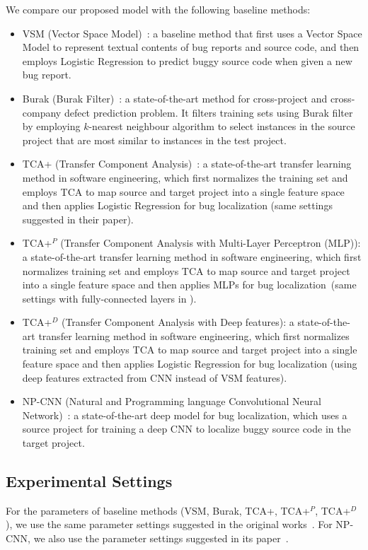 We compare our proposed model \TRANPCNN with the following baseline methods:
\begin{itemize}
  \item VSM (Vector Space Model)~\cite{rao2011retrieval}: a baseline method that first uses a Vector Space Model to represent textual contents of bug reports and source code, and then employs Logistic Regression to predict buggy source code when given a new bug report.
  \item Burak (Burak Filter)~\cite{peters2013better}: a state-of-the-art method for cross-project and cross-company defect prediction problem. It filters training sets using Burak filter by employing $k$-nearest neighbour algorithm to select instances in the source project that are most similar to instances in the test project.
  \item TCA+ (Transfer Component Analysis)~\cite{NamPK13}: a state-of-the-art transfer learning method in software engineering, which first normalizes the training set and employs TCA to map source and target project into a single feature space and then applies Logistic Regression for bug localization (same settings suggested in their paper). 
  \item TCA+$^P$ (Transfer Component Analysis with Multi-Layer Perceptron (MLP)): a state-of-the-art transfer learning method in software engineering, which first normalizes training set and employs TCA to map source and target project into a single feature space and then applies MLPs for bug localization~(same settings with fully-connected layers in \TRANPCNN).
   \item TCA+$^D$ (Transfer Component Analysis with Deep features): a state-of-the-art transfer learning method in software engineering, which first normalizes training set and employs TCA to map source and target project into a single feature space and then applies Logistic Regression for bug localization (using deep features extracted from CNN instead of VSM features).
  \item NP-CNN (Natural and Programming language Convolutional Neural Network)~\cite{huo2016learning}: a state-of-the-art deep model for bug localization, which uses a source project for training a deep CNN to localize buggy source code in the target project.
\end{itemize}

\subsection{Experimental Settings}
For the parameters of baseline methods (VSM, Burak, TCA+, TCA+$^{P}$, TCA+$^{D}$), we use the same parameter settings suggested in the original works~\cite{rao2011retrieval,NamPK13}. For NP-CNN, we also use the parameter settings suggested in its paper~\cite{huo2016learning}.

